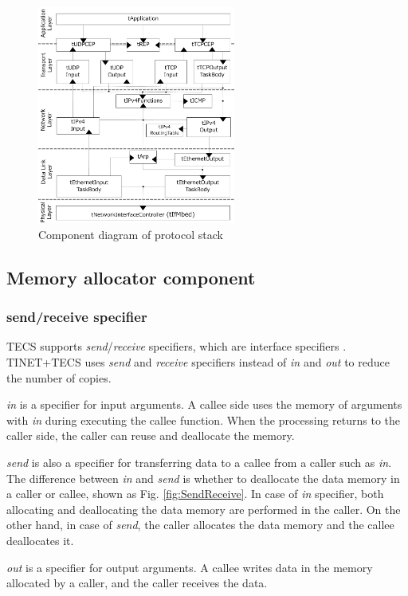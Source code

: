 \documentclass[conference]{IEEEtran/IEEEtran}
\begin{document}
\begin{figure}[t]
    \centering
    \includegraphics[width=6.5cm,clip]{figure/ComponentProtocolStack.pdf}
    \caption{Component diagram of protocol stack}
    \label{fig:ComponentProtocolStack}
\end{figure}

\subsection{Memory allocator component} 

\subsubsection{send/receive specifier}

TECS supports {\it send}/{\it receive} specifiers, which are interface specifiers \cite{par:RPC}.
TINET+TECS uses {\it send} and {\it receive} specifiers instead of {\it in} and {\it out} to reduce the number of copies.

{\it in} is a specifier for input arguments.
A callee side uses the memory of arguments with {\it in} during executing the callee function.
When the processing returns to the caller side, the caller can reuse and deallocate the memory.

{\it send} is also a specifier for transferring data to a callee from a caller such as {\it in}.
The difference between {\it in} and {\it send} is whether to deallocate the data memory in a caller or callee, shown as Fig. \ref{fig:SendReceive}.
In case of {\it in} specifier, both allocating and deallocating the data memory are performed in the caller.
On the other hand, in case of {\it send}, the caller allocates the data memory and the callee deallocates it.

{\it out} is a specifier for output arguments.
A callee writes data in the memory allocated by a caller, and the caller receives the data.
\end{document}
